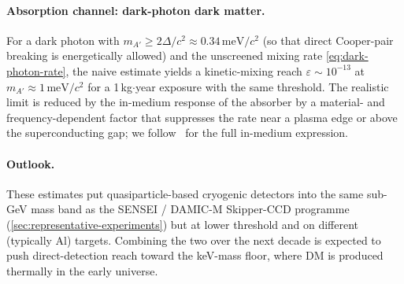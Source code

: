 \paragraph{Absorption channel: dark-photon dark matter.}
For a dark photon with $m_{A'}\geq 2\Delta/c^2\approx 0.34\,\text{meV}/c^2$
(so that direct Cooper-pair breaking is energetically allowed)
and the unscreened mixing rate \cref{eq:dark-photon-rate}, the
naive estimate yields a kinetic-mixing reach
$\varepsilon\sim 10^{-13}$ at $m_{A'}\approx 1\,\text{meV}/c^2$
for a 1\,kg$\cdot$year exposure with the same threshold. The
realistic limit is reduced by the in-medium response of the
absorber by a material- and frequency-dependent factor that
suppresses the rate near a plasma edge or above the
superconducting gap; we follow~\cite{caputo2021review} for the
full in-medium expression.

\paragraph{Outlook.}
These estimates put quasiparticle-based cryogenic detectors into
the same sub-GeV mass band as the SENSEI / DAMIC-M Skipper-CCD
programme (\cref{sec:representative-experiments}) but at lower
threshold and on different (typically Al) targets. Combining the
two over the next decade is expected to push direct-detection
reach toward the keV-mass floor, where DM is produced thermally
in the early universe.
